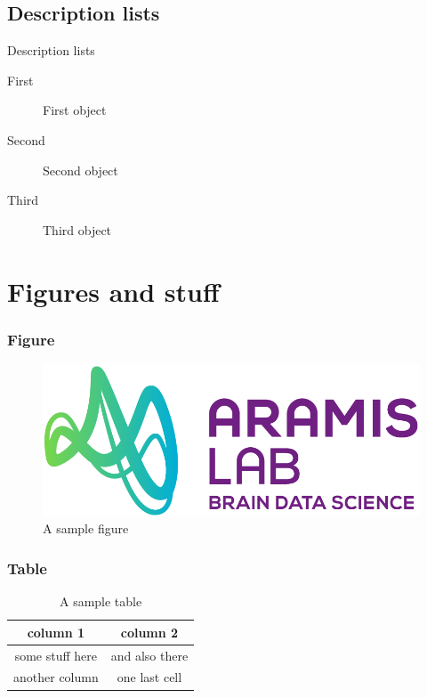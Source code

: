 \documentclass[
  11pt, %
  aspectratio=169, %
]{beamer}
\begin{document}
\subsection{Description lists}
\begin{frame}{Description lists}
  \begin{description}
    \item[First] First object
    \item[Second] Second object
    \item[Third] Third object
  \end{description}

\end{frame}

\section{Figures and stuff}

\begin{frame}
  \frametitle{Figure}

  \begin{figure}
    \includegraphics[height=.6\paperheight]{logos/logo_ARAMISLAB.png}
    \caption{A sample figure}
  \end{figure}

\end{frame}

\begin{frame}
  \frametitle{Table}

  \begin{table}
    \begin{tabular}{cc}
      \toprule
      column 1 & column 2\\
      \midrule
      some stuff here & and also there\\
      another column & one last cell\\
      \bottomrule
    \end{tabular}
    \caption{A sample table}
  \end{table}

\end{frame}
\end{document}

